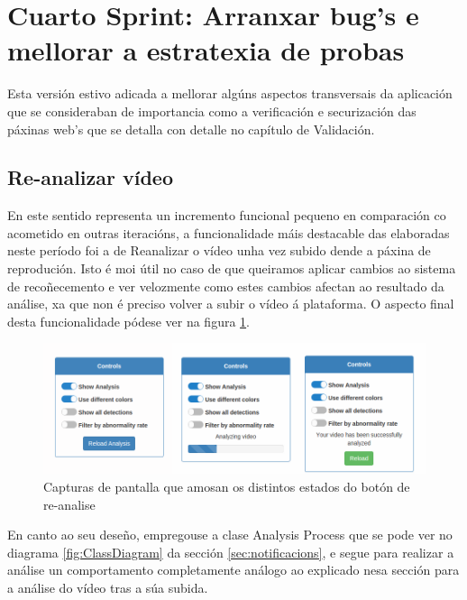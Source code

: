 \section{Cuarto Sprint: Arranxar bug's e mellorar a estratexia de probas}
    
    Esta versión estivo adicada a mellorar algúns aspectos transversais da aplicación que se 
    consideraban de importancia como a verificación e securización das páxinas web's que se detalla 
    con detalle no capítulo de Validación.
    
    \subsection{Re-analizar vídeo}
    En este sentido representa un incremento funcional 
        pequeno en comparación co acometido en outras iteracións, a funcionalidade máis destacable
        das elaboradas neste período foi a de Reanalizar o vídeo unha vez subido dende a páxina de 
        reprodución. Isto é moi útil no caso de que queiramos aplicar cambios ao sistema de 
        recoñecemento e ver velozmente como estes cambios afectan ao resultado da análise, xa que non é
        preciso volver a subir o vídeo á plataforma. O aspecto final desta funcionalidade pódese 
        ver na figura \ref{fig:reloadAnalysis}.
    
        \begin{figure}[htp]
        \begin{center}
            \includegraphics[scale=0.45]{figures/reloadAnalysis.png}
            \caption{Capturas de pantalla que amosan os distintos estados do botón de re-analise}
        \label{fig:reloadAnalysis}
        \end{center}
        \end{figure}

        En canto ao seu deseño, empregouse a clase Analysis Process que se pode ver no diagrama 
        \ref{fig:ClassDiagram} da sección \ref{sec:notificacions}, e segue para realizar a análise
        un comportamento completamente análogo ao explicado nesa sección para a análise do vídeo 
        tras a súa subida.
        
